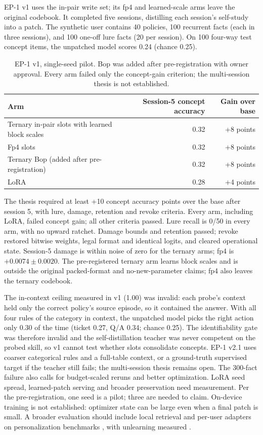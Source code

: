 \documentclass[11pt]{article}
\begin{document}
EP-1 v1 uses the in-pair write set; its fp4 and learned-scale arms leave the original codebook.
It completed five sessions, distilling each session's self-study into a patch. The synthetic
user contains 40 policies, 100 recurrent facts (each in three sessions), and 100 one-off lure facts
(20 per session). On 100 four-way test concept items, the unpatched model scores 0.24 (chance 0.25).
\begin{table}[!ht]\centering\small
\begin{tabular}{lrr}\toprule
Arm & Session-5 concept accuracy & Gain over base\\\midrule
Ternary in-pair slots with learned block scales & 0.32 & +8 points\\
Fp4 slots & 0.32 & +8 points\\
Ternary Bop (added after pre-registration) & 0.32 & +8 points\\
LoRA & 0.28 & +4 points\\\bottomrule
\end{tabular}
\caption{EP-1 v1, single-seed pilot. Bop was added after pre-registration with owner approval.
Every arm failed only the concept-gain criterion; the multi-session thesis is not established.}
\label{tab:ep1}
\end{table}
The thesis required at least +10 concept accuracy points over the base after session 5, with lure,
damage, retention and revoke criteria. Every arm, including LoRA, failed concept gain; all other
criteria passed. Lure recall is 0/50 in every arm, with no upward ratchet. Damage bounds and
retention passed; revoke restored bitwise weights, legal format and identical logits, and cleared
operational state. Session-5 damage is within noise of zero for the ternary arms; fp4 is
$+0.0074\pm0.0020$. The pre-registered ternary arm learns block scales and is outside the original
packed-format and no-new-parameter claims; fp4 also leaves the ternary codebook.

The in-context ceiling measured in v1 (1.00) was invalid: each probe's context held only the correct
policy's source episode, so it contained the answer. With all four rules of the category in context, the
unpatched model picks the right action only 0.30 of the time (ticket 0.27, Q/A 0.34; chance 0.25). The
identifiability gate was therefore invalid and the self-distillation teacher was never competent on the
probed skill, so v1 cannot test whether slots consolidate concepts. EP-1 v2.1 uses coarser categorical
rules and a full-table context, or a ground-truth supervised target if the teacher still fails; the
multi-session thesis remains open. The 300-fact
failure also calls for budget-scaled reruns and better optimization. LoRA seed spread, learned-patch
serving and broader preservation need measurement. Per the pre-registration, one seed is a pilot;
three are needed to claim. On-device training is not established: optimizer state can be large even
when a final patch is small. A broader evaluation should include local retrieval and per-user
adapters on personalization benchmarks \citep{lamp}, with unlearning measured \citep{sisa,tofu}.
\end{document}
